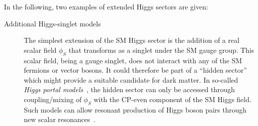 In the following, two examples of extended Higgs sectors are given:
\begin{description}

\item[Additional Higgs-singlet models] The simplest extension of the SM Higgs
  sector is the addition of a real scalar field $\phi_{S}$ that transforms as a
  singlet under the SM gauge group. This scalar field, being a gauge singlet,
  does not interact with any of the SM fermions or vector bosons. It could
  therefore be part of a ``hidden sector'' which might provide a suitable
  candidate for dark matter. In so-called \emph{Higgs portal
    models}~\cite{Patt:2006fw}, the hidden sector can only be accessed through
  coupling/mixing of $\phi_{S}$ with the CP-even component of the SM Higgs
  field. Such models can allow resonant production of Higgs boson pairs through
  new scalar
  resonances~\cite{Schabinger:2005ei,Bowen:2007ia,Barger:2007im,Dolan:2012ac,No:2013wsa,Chen:2014ask,Robens:2016xkb,DiMicco:2019ngk}.


\end{description}
